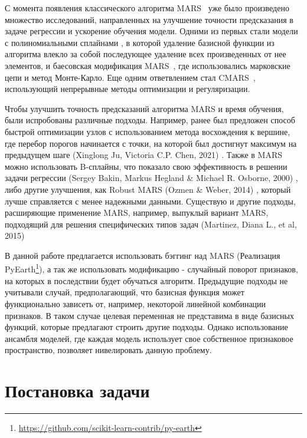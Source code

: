 \documentclass{article}
\begin{document}
С момента появления классического алгоритма MARS~\cite{friedman1991multivariate} уже было произведено множество исследований, направленных на улучшение точности предсказания в задаче регрессии и ускорение обучения модели. Одними из первых стали модели с полиномиальными сплайнами \cite{stone1997polynomial}, в которой удаление базисной функции из алгоритма влекло за собой последующее удаление всех произведенных от нее элементов, и баесовская модификация MARS~\cite{denison1998bayesian}, где использовались марковские цепи и метод Монте-Карло.
Еще одним ответвлением стал CMARS~\cite{weber2012cmars}, использующий непрерывные методы оптимизации и регуляризации. 

Чтобы улучшить точность предсказаний алгоритма MARS и время обучения, были испробованы различные подходы. Например, ранее был предложен способ быстрой оптимизации узлов с использованием метода восхождения к вершине, где перебор порогов начинается с точки, на которой был достигнут максимум на предыдущем шаге (Xinglong Ju, Victoria C.P. Chen, 2021) \cite{ju2021fast}. Также в MARS можно использовать B-сплайны, что показало свою эффективность в решении задачи регрессии (Sergey Bakin, Markus Hegland \& Michael R. Osborne, 2000) \cite{bakin2000parallel}, либо другие улучшения, как Robust MARS (Ozmen \& Weber, 2014) \cite{ozmen2011rcmars}, который лучше справляется с менее надежными данными. Существую и другие подходы, расширяющие применение MARS, например, выпуклый вариант MARS, подходящий для решения специфических типов задач (Martinez, Diana L., et al, 2015)\cite{martinez2015convex}

В данной работе предлагается использовать бэггинг над MARS (Реализация PyEarth\footnote{\url{https://github.com/scikit-learn-contrib/py-earth}}), а так же использовать модификацию - случайный поворот признаков, на которых в последствии будет обучаться алгоритм. Предыдущие подходы не учитывали случай, предполагающий, что базисная функция может функционально зависеть от, например, некоторой линейной комбинации признаков. В таком случае целевая переменная не представима в виде базисных функций, которые предлагают строить другие подходы. Однако использование ансамбля моделей, где каждая модель использует свое собственное признаковое пространство, позволяет нивелировать данную проблему.

\section{Постановка задачи}
\label{sec:headings}
\end{document}
